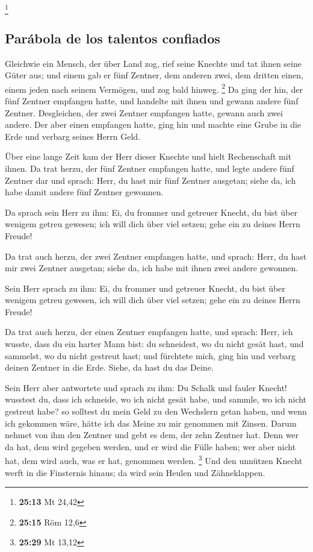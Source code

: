 \footnote{\textbf{25:13} Mt 24,42}

\hypertarget{paruxe1bola-de-los-talentos-confiados}{%
\subsection{Parábola de los talentos
confiados}\label{paruxe1bola-de-los-talentos-confiados}}

 Gleichwie ein Mensch, der über Land zog, rief seine
Knechte und tat ihnen seine Güter aus;  und einem gab er
fünf Zentner, dem anderen zwei, dem dritten einen, einem jeden nach
seinem Vermögen, und zog bald hinweg. \footnote{\textbf{25:15} Röm 12,6}
 Da ging der hin, der fünf Zentner empfangen hatte, und
handelte mit ihnen und gewann andere fünf Zentner. 
Desgleichen, der zwei Zentner empfangen hatte, gewann auch zwei andere.
 Der aber einen empfangen hatte, ging hin und machte eine
Grube in die Erde und verbarg seines Herrn Geld.

 Über eine lange Zeit kam der Herr dieser Knechte und
hielt Rechenschaft mit ihnen.  Da trat herzu, der fünf
Zentner empfangen hatte, und legte andere fünf Zentner dar und sprach:
Herr, du hast mir fünf Zentner ausgetan; siehe da, ich habe damit andere
fünf Zentner gewonnen.

 Da sprach sein Herr zu ihm: Ei, du frommer und getreuer
Knecht, du bist über wenigem getreu gewesen; ich will dich über viel
setzen; gehe ein zu deines Herrn Freude!

 Da trat auch herzu, der zwei Zentner empfangen hatte,
und sprach: Herr, du hast mir zwei Zentner ausgetan; siehe da, ich habe
mit ihnen zwei andere gewonnen.

 Sein Herr sprach zu ihm: Ei, du frommer und getreuer
Knecht, du bist über wenigem getreu gewesen, ich will dich über viel
setzen; gehe ein zu deines Herrn Freude!

 Da trat auch herzu, der einen Zentner empfangen hatte,
und sprach: Herr, ich wusste, dass du ein harter Mann bist: du
schneidest, wo du nicht gesät hast, und sammelst, wo du nicht gestreut
hast;  und fürchtete mich, ging hin und verbarg deinen
Zentner in die Erde. Siehe, da hast du das Deine.

 Sein Herr aber antwortete und sprach zu ihm: Du Schalk
und fauler Knecht! wusstest du, dass ich schneide, wo ich nicht gesät
habe, und sammle, wo ich nicht gestreut habe?  so
solltest du mein Geld zu den Wechslern getan haben, und wenn ich
gekommen wäre, hätte ich das Meine zu mir genommen mit Zinsen.
 Darum nehmet von ihm den Zentner und gebt es dem, der
zehn Zentner hat.  Denn wer da hat, dem wird gegeben
werden, und er wird die Fülle haben; wer aber nicht hat, dem wird auch,
was er hat, genommen werden. \footnote{\textbf{25:29} Mt 13,12}
 Und den unnützen Knecht werft in die Finsternis hinaus;
da wird sein Heulen und Zähneklappen.


